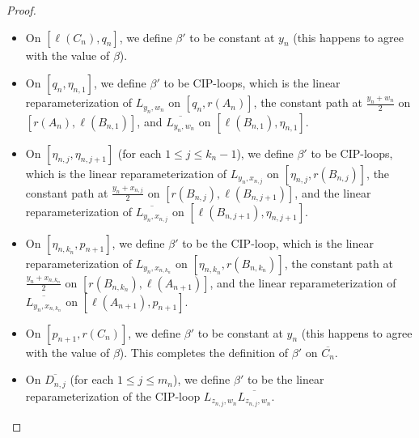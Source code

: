 \documentclass[10pt,a4paper]{amsart}
\newcommand{\ov}{\overline}
\begin{document}
\begin{proof}
\begin{itemize}
    \item[$\bf (B1)$]\label{beta'1} On $[\ell(C_n), q_n]$, we define $\beta'$ to be constant at $y_n$ (this happens to agree with the value of $\beta$).
\vspace{.75em}
    \item[$\bf (B2)$]\label{beta'2} On $[ q_n,\eta_{n,1}]$, we define $\beta'$ to be CIP-loops, which is the linear reparameterization of $L_{y_n,w_n}$ on $[ q_n,r(A_n)]$, the constant path at $\frac{y_n+w_n}{2}$ on $[r(A_n),\ell(B_{n,1})]$, and $\ov{L_{y_n,w_n}}$ on $[\ell(B_{n,1}),\eta_{n,1}]$.
\vspace{.75em}
    \item[$\bf (B3)$]\label{beta'3} On $[\eta_{n,j},\eta_{n,j+1}]$ (for each $ 1\leq j\leq k_n-1$), we define $\beta'$ to be CIP-loops, which is the linear reparameterization of $L_{y_n,x_{n,j}}$ on $[\eta_{n,j},r(B_{n,j})]$, the constant path at $\frac{y_n+x_{n,j}}{2}$ on $[r(B_{n,j}),\ell(B_{n,j+1})]$, and the linear reparameterization of $\ov{L_{y_n,x_{n,j}}}$ on $[\ell(B_{n,j+1}),\eta_{n,j+1}]$.
\vspace{.75em}
    \item[$\bf (B4)$]\label{beta'4} On $[\eta_{n,k_n},p_{n+1}]$, we define $\beta'$ to be the CIP-loop, which is the linear reparameterization of $L_{y_n,x_{n,k_n}}$ on $[\eta_{n,k_n},r(B_{n,k_n})]$, the constant path at $\frac{y_n+x_{n,k_n}}{2}$ on $[r(B_{n,k_n}),\ell(A_{n+1})]$, and the linear reparameterization of $\ov{L_{y_n,x_{n,k_n}}}$ on $[\ell(A_{n+1}),p_{n+1}]$.
\vspace{.75em}
    \item[$\bf (B5)$]\label{beta'5} On $[p_{n+1},r(C_n)]$, we define $\beta'$ to be constant at $y_n$ (this happens to agree with the value of $\beta$). This completes the definition of $\beta '$ on $\ov{C_n}$.
\vspace{.75em}
    \item[$\bf (B6)$]\label{beta'6} On $\ov{D_{n,j}}$ (for each $1\leq j\leq m_n$), we define $\beta'$ to be the linear reparameterization of the CIP-loop $L_{z_{n,j},w_{n}} \ov{L_{z_{n,j},w_{n}}}$.
\end{itemize}


\end{proof}
\end{document}

